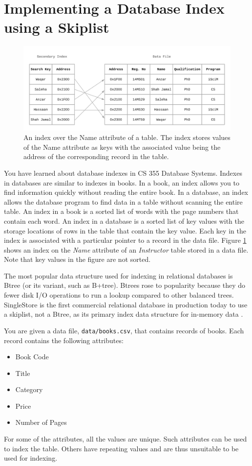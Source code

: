 \documentclass[addpoints]{exam}
\begin{document}
\newpage
\part{Implementing a Database Index using a Skiplist}

\begin{figure}[!h]
  \centering
  \includegraphics[width=.8\linewidth]{index}
  \caption{An index over the Name attribute of a table. The index stores values of the Name attribute as keys with the associated value being the address of the corresponding record in the table.}
  \label{fig:index}
\end{figure}

You have learned about database indexes in CS 355 Database Systems. Indexes in databases are similar to indexes in books. In a book, an index allows you to find information quickly without reading the entire book. In a database, an index allows the database program to find data in a table without scanning the entire table. An index in a book is a sorted list of words with the page numbers that contain each word. An index in a database is a sorted list of key values with the storage locations of rows in the table that contain the key value. Each key in the index is associated with a particular pointer to a record in the data file. Figure \ref{fig:index} shows an index on the \textit{Name} attribute of an \textit{Instructor} table stored in a data file. Note that key values in the figure are not sorted.

The most popular data structure used for indexing in relational databases is Btree (or its variant, such as B+tree). Btrees rose to popularity because they do fewer disk I/O operations to run a lookup compared to other balanced trees. SingleStore is the first commercial relational database in production today to use a skiplist, not a Btree, as its primary index data structure for in-memory data \cite{singlestore}.

You are given a data file, \texttt{data/books.csv}, that contains records of books. Each record contains the following attributes:
\begin{itemize}
  \item Book Code
  \item Title
  \item Category
  \item Price
  \item Number of Pages
\end{itemize}
For some of the attributes, all the values are unique. Such attributes can be used to index the table. Others have repeating values and are thus unsuitable to be used for indexing.
\end{document}
